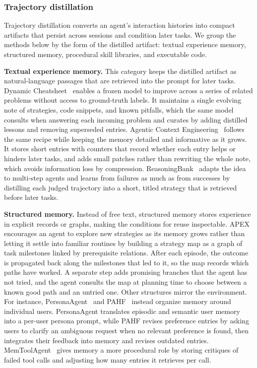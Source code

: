 \subsubsection{Trajectory distillation}

Trajectory distillation converts an agent's interaction histories into compact artifacts that persist across sessions and condition later tasks.  We group the methods below by the form of the distilled artifact: textual experience memory, structured memory, procedural skill libraries, and executable code.

\noindent\textbf{Textual experience memory.} This category keeps the distilled artifact as natural-language passages that are retrieved into the prompt for later tasks. Dynamic Cheatsheet~\cite{suzgun2026dynamic} enables a frozen model to improve across a series of related problems without access to ground-truth labels. It maintains a single evolving note of strategies, code snippets, and known pitfalls, which the same model consults when answering each incoming problem and curates by adding distilled lessons and removing superseded entries. Agentic Context Engineering~\cite{zhang2026agentic} follows the same recipe while keeping the memory detailed and informative as it grows. It stores short entries with counters that record whether each entry helps or hinders later tasks, and adds small patches rather than rewriting the whole note, which avoids information loss by compression. ReasoningBank~\cite{ouyang2026reasoningbank} adapts the idea to multi-step agents and learns from failures as much as from successes by distilling each judged trajectory into a short, titled strategy that is retrieved before later tasks.

\noindent\textbf{Structured memory.} Instead of free text, structured memory stores experience in explicit records or graphs, making the conditions for reuse inspectable. APEX~\cite{li2026apex} encourages an agent to explore new strategies as its memory grows rather than letting it settle into familiar routines by building a strategy map as a graph of task milestones linked by prerequisite relations. After each episode, the outcome is propagated back along the milestones that led to it, so the map records which paths have worked. A separate step adds promising branches that the agent has not tried, and the agent consults the map at planning time to choose between a known good path and an untried one. Other structures mirror the environment. For instance, PersonaAgent~\cite{zhang2026personaagent} and PAHF~\cite{liang2026learning} instead organize memory around individual users. PersonaAgent translates episodic and semantic user memory into a per-user persona prompt, while PAHF revises preference entries by asking users to clarify an ambiguous request when no relevant preference is found, then integrates their feedback into memory and revises outdated entries. MemToolAgent~\cite{er2026memtoolagent} gives memory a more procedural role by storing critiques of failed tool calls and adjusting how many entries it retrieves per call.

